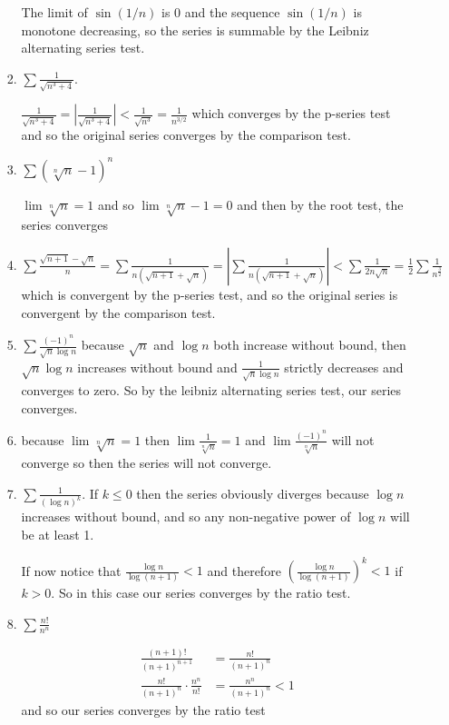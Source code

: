 \documentclass[letterpaper]{article}
\begin{document}
\begin{enumerate}
\begin{enumerate}
\begin{enumerate}
    The limit of $\sin(1/n)$ is 0 and the sequence $\sin(1/n)$ is monotone decreasing, so the series is summable by the Leibniz  alternating series test.
  \item
    $\sum\limits{\frac{1}{\sqrt{n^3+4}}}$.

    $\frac{1}{\sqrt{n^3+4}}=\left\lvert\frac{1}{\sqrt{n^3+4}}\right\rvert<\frac{1}{\sqrt{n^3}}=\frac{1}{n^{3/2}}$ which converges by the p-series test and so the original series converges by the comparison test.
  \item
    $\sum\limits{(\sqrt[n]{n}-1)^n}$

    $\lim \sqrt[n]{n}=1$ and so $\lim \sqrt[n]{n}-1=0$ and then by the root test, the series converges
  \item
    $\sum\limits{\frac{\sqrt{n+1}-\sqrt{n}}{n}}=\sum\limits{\frac{1}{n(\sqrt{n+1}+\sqrt{n})}}=\left\lvert\sum\limits{\frac{1}{n(\sqrt{n+1}+\sqrt{n})}}\right\rvert<\sum\limits{\frac{1}{2n\sqrt{n}}}=\frac{1}{2}\sum\limits{\frac{1}{n^\frac{3}{2}}}$ which is convergent by the p-series test, and so the original series is convergent by the comparison test.
  \item
  $\sum\limits{\frac{(-1)^n}{\sqrt{n}\log n}}$ because $\sqrt{n}$ and $\log n$ both increase without bound, then $\sqrt{n}\log n$ increases without bound and $\frac{1}{\sqrt{n}\log n}$ strictly decreases  and converges to zero. So by the leibniz alternating series test, our series converges.
  \item
    because $\lim \sqrt[n]{n}=1$ then $\lim \frac{1}{\sqrt[n]{n}}=1$ and $\lim \frac{(-1)^n}{\sqrt[n]{n}}$ will not converge so then the series will not converge.
  \item
    $\sum\limits{\frac{1}{(\log n)^k}}$. If $k\le0$ then the series obviously diverges because $\log n$ increases without bound, and so any non-negative power of $\log n$ will be at least 1. 

    If now notice that $\frac{\log n}{\log (n+1)}<1$ and therefore $\left(\frac{\log n}{\log (n+1)}\right)^k<1$ if $k>0$. So in this case our series converges by the ratio test.
  \item
    $\sum\limits{\frac{n!}{n^n}}$

    \begin{align*}
      \frac{(n+1)!}{(n+1)^{n+1}}&=\frac{n!}{(n+1)^n}\\
      \frac{n!}{(n+1)^n}\cdot\frac{n^n}{n!}&=\frac{n^n}{(n+1)^n}<1
    \end{align*}
    and so our series converges by the ratio test
  \end{enumerate}


\end{enumerate}
\end{enumerate}
\end{document}
